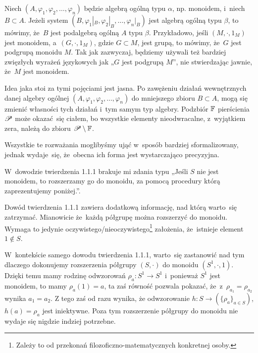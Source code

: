\documentclass[a4paper,11pt]{article}
\begin{document}
Niech $( A, \varphi_{ 1 }, \varphi_{ 2 }, \ldots, \varphi_{ n } )$ będzie algebrą ogólną typu $\alpha$, np.
monoidem, i~niech $B \subset A$. Jeżeli system
$( B, \varphi_{ 1 }|_{ B }, \varphi_{ 2 }|_{ B }, \ldots, \varphi_{ n }|_{ B } )$ jest algebrą ogólną
typu $\beta$, to mówimy, że~$B$ jest podalgebrą ogólną $A$ typu $\beta$.
Przykładowo, jeśli $( M, \cdot, 1_{ M } )$ jest monoidem, a~$( G, \cdot, 1_{ M } )$,
gdzie $G \subset M$, jest grupą, to mówimy, że~$G$ jest podgrupą monoidu $M$. Tak
jak zazwyczaj, będziemy używali też bardziej zwięzłych wyrażeń językowych
jak „$G$ jest podgrupą $M$”, nie stwierdzając jawnie, że~$M$ jest monoidem.

Idea jaka stoi za tymi pojęciami jest jasna. Po zawężeniu działań
wewnętrznych danej algebry ogólnej $( A, \varphi_{ 1 }, \varphi_{ 2 }, \ldots, \varphi_{ n } )$ do
mniejszego zbioru $B \subset A$, mogą się zmienić własności tych działań i~tym
samym typ algebry. Podzbiór $\mathbb{F}$ pierścienia $\mathcal{P}$ może okazać~się
ciałem, bo wszystkie elementy nieodwracalne, z~wyjątkiem zera, należą do
zbioru $\mathcal{P} \setminus \mathbb{F}$.

Wszystkie te rozważania moglibyśmy ująć w~sposób bardziej sformalizowany,
jednak wydaje~się, że~obecna ich forma jest wystarczająco precyzyjna.

\vspace{\spaceFour}





\start {} W~dowodzie twierdzenia 1.1.1 brakuje mi zdania typu
„Jeśli $S$ nie jest monoidem, to rozszerzamy go do monoidu, za pomocą
procedury którą zaprezentujemy poniżej.”.

\vspace{\spaceFour}





\start {} Dowód twierdzenia 1.1.1 zawiera dodatkową informację,
nad którą warto~się zatrzymać. Mianowicie że~każdą półgrupę można
rozszerzyć do monoidu. Wymaga to jedynie
oczywistego/nieoczywistego\footnote{Zależy to od przekonań
  filozoficzno-matematycznych konkretnej osoby.} założenia, że~istnieje
element $1 \notin S$.

W~kontekście samego dowodu twierdzenia 1.1.1, warto~się zastanowić nad
tym dlaczego dokonujemy rozszerzenia półgrupy $( S, \cdot )$ do
monoidu $( S^{ 1 }, \cdot, 1 )$. Dzięki temu mamy rodzinę odwzorowań
$\rho_{ a } : S^{ 1 } \to S^{ 1 }$ i~ponieważ $S^{ 1 }$ jest monoidem,
to mamy $\rho_{ a }( 1 ) = a$, ta zaś równość pozwala pokazać,
że~z~$\rho_{ a_{ 1 } } = \rho_{ a_{ 2 } }$ wynika $a_{ 1 } = a_{ 2 }$.
Z tego zaś od razu wynika, że odwzorowanie
$h : S \to ( \{ \rho_{ a } \}_{ a \in S } )$, $h( a ) = \rho_{ a }$
jest iniektywne. Poza tym rozszerzenie półgrupy do monoidu nie wydaje
się nigdzie indziej potrzebne.
\end{document}
